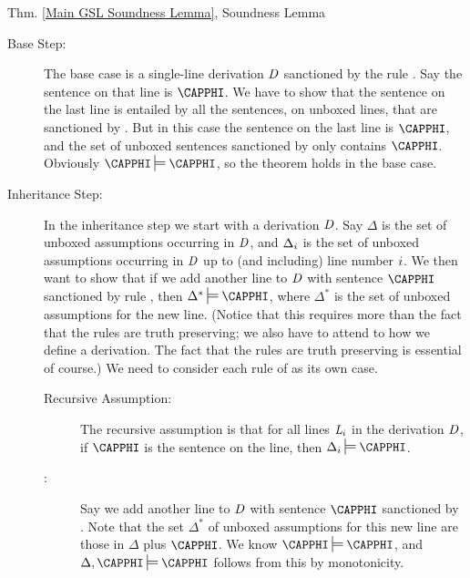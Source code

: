 \begin{PROOFOF}{Thm. \ref{Main GSL Soundness Lemma}, Soundness Lemma}
\begin{description}

\item[Base Step:] 
The base case is a single-line derivation $\mathit{D}$ sanctioned by the rule . 
Say the sentence on that line is $\CAPPHI$.
We have to show that the sentence on the last line is entailed by all the sentences, on unboxed lines, that are sanctioned by . 
But in this case the sentence on the last line is $\CAPPHI$, and the set of unboxed sentences sanctioned by  only contains $\CAPPHI$. 
Obviously $\CAPPHI\sdtstile{}{}\CAPPHI$, so the theorem holds in the base case. 

\item[Inheritance Step:] 
In the inheritance step we start with a derivation $\mathit{D}$.
Say $\Delta$ is the set of unboxed assumptions occurring in $\mathit{D}$, and $\Delta_i$ is the set of unboxed assumptions occurring in $\mathit{D}$ up to (and including) line number $i$. 
We then want to show that if we add another line to $\mathit{D}$ with sentence $\CAPPHI$ sanctioned by rule , then $\Delta^*\sdtstile{}{}\CAPPHI$, where $\Delta^*$ is the set of unboxed assumptions for the new line. 
(Notice that this requires more than the fact that the rules are truth preserving; we also have to attend to how we define a derivation. The fact that the rules are truth preserving is essential of course.) 
We need to consider each rule  of \GSD{} as its own case.

\begin{description}

\item[Recursive Assumption:]  
The recursive assumption is that for all lines $\mathit{L}_i$ in the derivation $\mathit{D}$, if $\CAPPHI$ is the sentence on the line, then $\Delta_{\integer{i}}\sdtstile{}{}\CAPPHI$. 

\item[:] 
Say we add another line to $\mathit{D}$ with sentence $\CAPPHI$ sanctioned by . 
Note that the set $\Delta^*$ of unboxed assumptions for this new line are those in $\Delta$ plus $\CAPPHI$. 
We know $\CAPPHI\sdtstile{}{}\CAPPHI$, and $\Delta,\CAPPHI\sdtstile{}{}\CAPPHI$ follows from this by monotonicity.


\end{description}
\end{description}
\end{PROOFOF}
